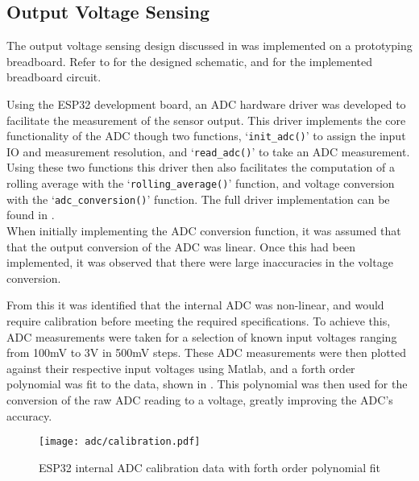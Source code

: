 
\subsection{Output Voltage Sensing}\label{S:v_sense_impl}

The output voltage sensing design discussed in  was implemented on a prototyping breadboard. Refer to  for the designed schematic, and  for the implemented breadboard circuit.

Using the ESP32 development board, an ADC hardware driver was developed to facilitate the measurement of the sensor output. This driver implements the core functionality of the ADC though two functions, `\lstinline{init_adc()}' to assign the input IO and measurement resolution, and `\lstinline{read_adc()}' to take an ADC measurement. Using these two functions this driver then also facilitates the computation of a rolling average with the `\lstinline{rolling_average()}' function, and voltage conversion with the `\lstinline{adc_conversion()}' function. The full driver implementation can be found in .\\

When initially implementing the ADC conversion function, it was assumed that that the output conversion of the ADC was linear. Once this had been implemented, it was observed that there were large inaccuracies in the voltage conversion. 

From this it was identified that the internal ADC  was non-linear, and would require calibration before meeting the required specifications. To achieve this, ADC measurements were taken for a selection of known input voltages ranging from 100mV to 3V in 500mV steps. These ADC measurements were then plotted against their respective input voltages using Matlab, and a forth order polynomial was fit to the data, shown in . This polynomial was then used for the conversion of the raw ADC reading to a voltage, greatly improving the ADC's accuracy.

\begin{figure}[!h]
    \centering
    \texttt{[image: adc/calibration.pdf]}
    \caption{ESP32 internal ADC calibration data with forth order polynomial fit}
    \label{F:adc_calibration}
\end{figure}

